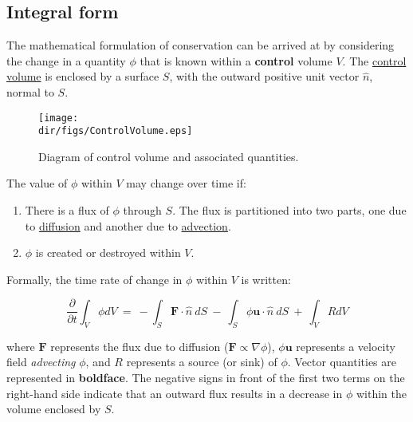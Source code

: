 \subsection{Integral form}

The mathematical formulation of conservation can be arrived at by considering the change in a quantity 
$\phi$ that is known within a \textbf{control} volume $V$. The \href{http://en.wikipedia.org/wiki/Control_volume}
{control volume} is enclosed by a surface $S$, with the outward positive unit vector $\hat n$, normal to $S$.

\begin{figure}
  \begin{center}
    \texttt{[image: \\dir/figs/ControlVolume.eps]}
  \end{center}
  \caption{Diagram of control volume and associated quantities.}
  \label{fig:controlvol}
\end{figure} 

The value of $\phi$ within $V$ may change over time if:

\begin{enumerate}
\itemsep1pt\parskip0pt
\item
  There is a flux of $\phi$ through $S$. The flux is partitioned into two parts,
  one due to \href{http://en.wikipedia.org/wiki/Diffusion}{diffusion} and another 
  due to \href{http://en.wikipedia.org/wiki/Advection}{advection}.
\item
  $\phi$ is created or destroyed within $V$.
\end{enumerate}

Formally, the time rate of change in $\phi$ within $V$ is written:

\begin{equation}
{\frac{ \partial }{ \partial t}} { \int }_{ V} \phi dV~ = ~ -{ \int }_{ S} {\mathbf F}
    {\cdot} \hat n~ dS~ - ~{ \int }_{ S} \phi {\mathbf u} {\cdot} \hat n ~ dS~
    + ~{ \int }_{ V} R dV
    \label{eq:intcons}
\end{equation}

where ${\mathbf F}$ represents the flux due to diffusion
($\mathbf{F} \propto \nabla \phi$), $\phi {\mathbf u}$ represents a velocity field 
\emph{advecting} $\phi$, and $R$ represents a source (or sink) of $\phi$. Vector quantities are
represented in \textbf{boldface}. The negative signs in front of the first two terms on the right-hand 
side indicate that an outward flux results in a decrease in $\phi$ within the volume enclosed by $S$.

